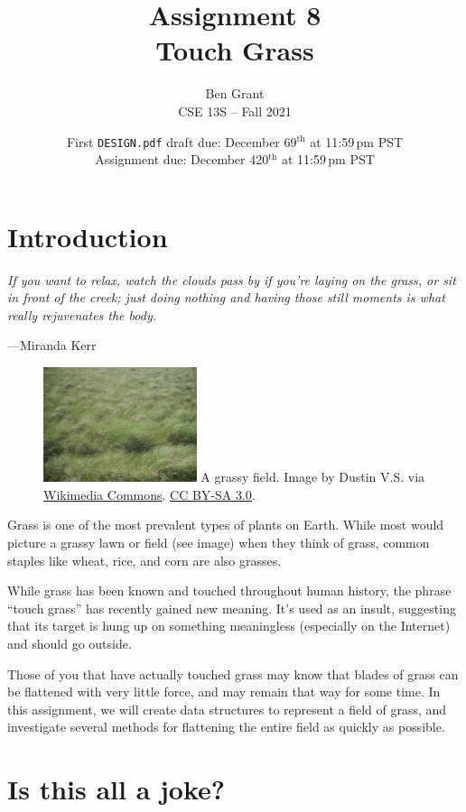 \documentclass[11pt]{article}
\title{
    Assignment 8 \\
    Touch Grass
}
\author{
    Ben Grant \\
    CSE 13S -- Fall 2021
}
\date{
    First \texttt{DESIGN.pdf} draft due: December 69$^\text{th}$ at 11:59\,pm PST \\
    Assignment due: December 420$^\text{th}$ at 11:59\,pm PST
}
\begin{document}
\maketitle
\section{Introduction}

\setlength{\epigraphwidth}{0.76\textwidth}
\epigraph{\emph{If you want to relax, watch the clouds pass by if you're laying on the grass, or sit in front of the creek; just doing nothing and having those still moments is what really rejuvenates the body.}}{---Miranda Kerr}

\begin{figure}
\includegraphics[width=0.4\textwidth]{field}
A grassy field. Image by Dustin V.S. via \href{https://commons.wikimedia.org/wiki/File:Grasses_in_the_Valles_Caldera_2014-06-26.JPG}{Wikimedia Commons}. \href{https://creativecommons.org/licenses/by-sa/3.0/deed.en}{CC BY-SA 3.0}.
\end{figure}

\noindent
Grass is one of the most prevalent types of plants on Earth. While most would picture a grassy lawn or field (see image) when they think of grass, common staples like wheat, rice, and corn are also grasses.

While grass has been known and touched throughout human history, the phrase ``touch grass'' has recently gained new meaning. It's used as an insult, suggesting that its target is hung up on something meaningless (especially on the Internet) and should go outside.

Those of you that have actually touched grass may know that blades of grass can be flattened with very little force, and may remain that way for some time. In this assignment, we will create data structures to represent a field of grass, and investigate several methods for flattening the entire field as quickly as possible.

\section{Is this all a joke?}
\end{document}
